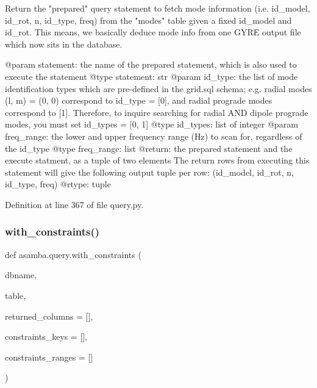 \begin{DoxyVerb}Return the "prepared" query statement to fetch mode information (i.e. id_model, id_rot, n, id_type, 
freq) from the "modes" table given a fixed id_model and id_rot. This means, we basically deduce mode info
from one GYRE output file which now sits in the database.

@param statement: the name of the prepared statement, which is also used to execute the statement
@type statement: str
@param id_type: the list of mode identification types which are pre-defined in the grid.sql schema;
       e.g. radial modes (l, m) = (0, 0) correspond to id_type = [0], and radial prograde modes 
       correspond to [1]. Therefore, to inquire searching for radial AND dipole prograde modes, you
       must set id_types = [0, 1]
@type id_types: list of integer
@param freq_range: the lower and upper frequency range (Hz) to scan for, regardless of the id_type
@type freq_range: list
@return: the prepared statement and the execute statment, as a tuple of two elements
       The return rows from executing this statement will give the following
       output tuple per row: (id_model, id_rot, n, id_type, freq)
@rtype: tuple
\end{DoxyVerb}
 

Definition at line 367 of file query.\+py.

\mbox{\label{namespaceasamba_1_1query_abaf522b54d321283c1bdc7a688cfb9d2}} 
\subsubsection{\texorpdfstring{with\+\_\+constraints()}{with\_constraints()}}
{\footnotesize\ttfamily def asamba.\+query.\+with\+\_\+constraints (\begin{DoxyParamCaption}\item[{}]{dbname,  }\item[{}]{table,  }\item[{}]{returned\+\_\+columns = {\ttfamily \mbox{[}\mbox{]}},  }\item[{}]{constraints\+\_\+keys = {\ttfamily \mbox{[}\mbox{]}},  }\item[{}]{constraints\+\_\+ranges = {\ttfamily \mbox{[}\mbox{]}} }\end{DoxyParamCaption})}

